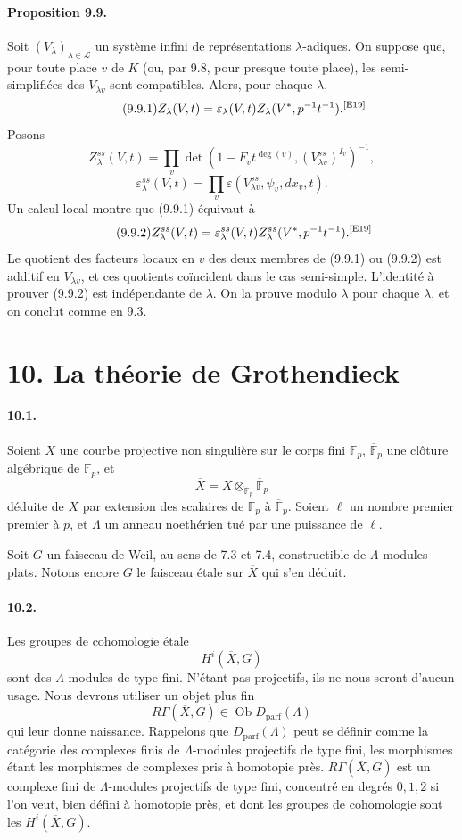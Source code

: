 \documentclass[10pt,letterpaper]{article}
\newcommand{\F}{\mathbb F}
\providecommand{\LLL}{\mathcal L}
\providecommand{\Dparf}{D_{\mathrm{parf}}}
\newcommand{\auditmark}[1]{\textsuperscript{\normalfont\scriptsize[E#1]}}
\begin{document}
\paragraph{Proposition 9.9.} Soit $(V_\lambda)_{\lambda\in\LLL}$ un système infini de représentations $\lambda$-adiques. On suppose que, pour toute place $v$ de $K$ (ou, par 9.8, pour presque toute place), les semi-simplifiées des $V_{\lambda v}$ sont compatibles. Alors, pour chaque $\lambda$,
\[
\tag{9.9.1}
Z_\lambda(V,t)=\varepsilon_\lambda(V,t)Z_\lambda(V^*,p^{-1}t^{-1}).\auditmark{19}
\]
Posons
\[
Z_\lambda^{ss}(V,t)=
\prod_v\det(1-F_vt^{\deg(v)},(V_{\lambda v}^{ss})^{I_v})^{-1},
\]
\[
\varepsilon_\lambda^{ss}(V,t)=
\prod_v\varepsilon(V_{\lambda v}^{ss},\psi_v,dx_v,t).
\]
Un calcul local montre que (9.9.1) équivaut à
\[
\tag{9.9.2}
Z_\lambda^{ss}(V,t)=
\varepsilon_\lambda^{ss}(V,t)Z_\lambda^{ss}(V^*,p^{-1}t^{-1}).\auditmark{19}
\]
Le quotient des facteurs locaux en $v$ des deux membres de (9.9.1) ou (9.9.2) est additif en $V_{\lambda v}$, et ces quotients coïncident dans le cas semi-simple. L'identité à prouver (9.9.2) est indépendante de $\lambda$. On la prouve modulo $\lambda$ pour chaque $\lambda$, et on conclut comme en 9.3.




\section*{10. La théorie de Grothendieck}

\paragraph{10.1.} Soient \(X\) une courbe projective non singulière sur le corps fini \(\F_p\), \(\overline{\F}_p\) une clôture algébrique de \(\F_p\), et
\[
\overline X=X\otimes_{\F_p}\overline{\F}_p
\]
déduite de \(X\) par extension des scalaires de \(\F_p\) à \(\overline{\F}_p\). Soient \(\ell\) un nombre premier premier à \(p\), et \(\Lambda\) un anneau noethérien tué par une puissance de \(\ell\).

Soit \(G\) un faisceau de Weil, au sens de 7.3 et 7.4, constructible de \(\Lambda\)-modules plats. Notons encore \(G\) le faisceau étale sur \(\overline X\) qui s'en déduit.

\paragraph{10.2.} Les groupes de cohomologie étale
\[
H^i(\overline X,G)
\]
sont des \(\Lambda\)-modules de type fini. N'étant pas projectifs, ils ne nous seront d'aucun usage. Nous devrons utiliser un objet plus fin
\[
R\Gamma(\overline X,G)\in\operatorname{Ob}\Dparf(\Lambda)
\]
qui leur donne naissance. Rappelons que \(\Dparf(\Lambda)\) peut se définir comme la catégorie des complexes finis de \(\Lambda\)-modules projectifs de type fini, les morphismes étant les morphismes de complexes pris à homotopie près. \(R\Gamma(\overline X,G)\) est un complexe fini de \(\Lambda\)-modules projectifs de type fini, concentré en degrés \(0,1,2\) si l'on veut, bien défini à homotopie près, et dont les groupes de cohomologie sont les \(H^i(\overline X,G)\).
\end{document}
